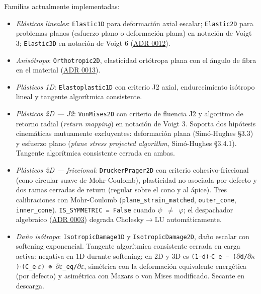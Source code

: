 \documentclass[11pt,oneside]{report}
\begin{document}
Familias actualmente implementadas:

\begin{itemize}
  \item \textit{Elásticos lineales}: \texttt{Elastic1D} para deformación axial escalar; \texttt{Elastic2D} para problemas planos (esfuerzo plano o deformación plana) en notación de Voigt 3; \texttt{Elastic3D} en notación de Voigt 6 (\hyperref[adr:0012]{ADR 0012}).
  \item \textit{Anisótropo}: \texttt{Orthotropic2D}, elasticidad ortótropa plana con el ángulo de fibra en el material (\hyperref[adr:0013]{ADR 0013}).
  \item \textit{Plásticos 1D}: \texttt{Elastoplastic1D} con criterio J2 axial, endurecimiento isótropo lineal y tangente algorítmica consistente.
  \item \textit{Plásticos 2D --- J2}: \texttt{VonMises2D} con criterio de fluencia J2 y algoritmo de retorno radial (\textit{return mapping}) en notación de Voigt 3. Soporta dos hipótesis cinemáticas mutuamente excluyentes: deformación plana (Simó-Hughes §3.3) y esfuerzo plano (\textit{plane stress projected algorithm}, Simó-Hughes §3.4.1). Tangente algorítmica consistente cerrada en ambas.
  \item \textit{Plásticos 2D --- friccional}: \texttt{DruckerPrager2D} con criterio cohesivo-friccional (cono circular suave de Mohr-Coulomb), plasticidad no asociada por defecto y dos ramas cerradas de return (regular sobre el cono y al ápice). Tres calibraciones con Mohr-Coulomb (\texttt{plane\_\allowbreak{}strain\_\allowbreak{}matched}, \texttt{outer\_cone}, \texttt{inner\_cone}). \texttt{IS\_\allowbreak{}SYMMETRIC = False} cuando \texttt{\ensuremath{\psi} \ensuremath{\neq} \ensuremath{\varphi}}; el despachador algebraico (\hyperref[adr:0003]{ADR 0003}) degrada Cholesky\ensuremath{\to}LU automáticamente.
  \item \textit{Daño isótropo}: \texttt{IsotropicDamage1D} y \texttt{IsotropicDamage2D}, daño escalar con softening exponencial. Tangente algorítmica consistente cerrada en carga activa: negativa en 1D durante softening; en 2D y 3D es \texttt{(1−d)\ensuremath{\cdot}C\_\allowbreak{}e − (\ensuremath{\partial}d/\allowbreak{}\ensuremath{\partial}\ensuremath{\kappa})\ensuremath{\cdot}(C\_\allowbreak{}e\ensuremath{\cdot}\ensuremath{\varepsilon}) ⊗ \ensuremath{\partial}\ensuremath{\varepsilon}\_\allowbreak{}eq/\allowbreak{}\ensuremath{\partial}\ensuremath{\varepsilon}}, simétrica con la deformación equivalente energética (por defecto) y asimétrica con Mazars o von Mises modificado. Secante en descarga.

\end{itemize}
\end{document}

